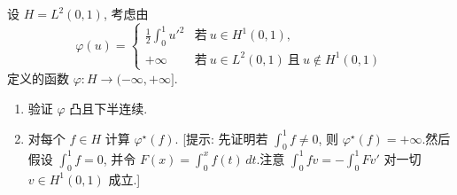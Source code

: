 \begin{exercise}
\label{exer:8.19}
设 $H=L^2(0,1)$, 考虑由
\begin{equation*}
\varphi(u)=
\begin{cases}
\frac12\int_0^1u'^2 & \text{若}\ u\in H^1(0,1),\\
+\infty & \text{若}\ u\in L^2(0,1)\ \text{且}\ u\notin H^1(0,1)
\end{cases}
\end{equation*}
定义的函数 $\varphi:H\to(-\infty,+\infty]$.
\begin{enumerate}[label=\arabic*., leftmargin=2.2em, itemsep=0.3em]
	\item 验证 $\varphi$ 凸且下半连续.
	\item 对每个 $f\in H$ 计算 $\varphi^\star(f)$.
	      [提示: 先证明若 $\int_0^1f\ne0$, 则
	      $\varphi^\star(f)=+\infty$.然后假设
	      $\int_0^1f=0$, 并令 $F(x)=\int_0^xf(t)\,dt$.注意
	      $\int_0^1fv=-\int_0^1Fv'$ 对一切 $v\in H^1(0,1)$ 成立.]
\end{enumerate}
\end{exercise}

